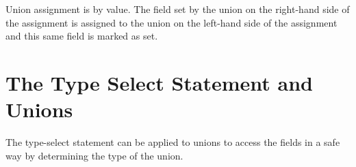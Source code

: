 Union assignment is by value.  The field set by the union on the
right-hand side of the assignment is assigned to the union on the
left-hand side of the assignment and this same field is marked as set.

\section{The Type Select Statement and Unions}
\label{The_Type_Select_Statement_and_Unions}

The type-select statement can be applied to unions to access the
fields in a safe way by determining the type of the union.
